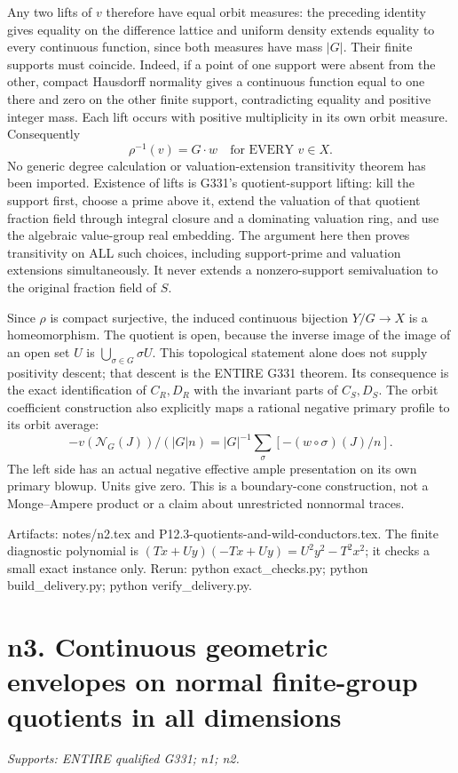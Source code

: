 \documentclass[11pt]{article}
\begin{document}
Any two lifts of $v$ therefore have equal orbit measures: the preceding
identity gives equality on the difference lattice and uniform density
extends equality to every continuous function, since both measures have
mass $|G|$. Their finite supports must coincide. Indeed, if a point of
one support were absent from the other, compact Hausdorff normality gives
a continuous function equal to one there and zero on the other finite
support, contradicting equality and positive integer mass. Each lift
occurs with positive multiplicity in its own orbit measure. Consequently
\[
 \rho^{-1}(v)=G\cdot w\quad\text{for EVERY }v\in X.
\]
No generic degree calculation or valuation-extension transitivity theorem
has been imported. Existence of lifts is G331's quotient-support lifting:
kill the support first, choose a prime above it, extend the valuation of
that quotient fraction field through integral closure and a dominating
valuation ring, and use the algebraic value-group real embedding.
The argument here then proves transitivity on ALL such choices, including
support-prime and valuation extensions simultaneously. It never extends
a nonzero-support semivaluation to the original fraction field of $S$.

Since $\rho$ is compact surjective, the induced continuous bijection
$Y/G\to X$ is a homeomorphism. The quotient is open, because the inverse
image of the image of an open set $U$ is $\bigcup_{\sigma\in G}\sigma U$.
This topological statement alone does not supply positivity descent;
that descent is the ENTIRE G331 theorem. Its consequence is the exact
identification of $C_R,D_R$ with the invariant parts of $C_S,D_S$.
The orbit coefficient construction also explicitly maps a rational
negative primary profile to its orbit average:
\[
 -v(\mathcal N_G(J))/(|G|n)
   =|G|^{-1}\sum_\sigma[-(w\circ\sigma)(J)/n].
\]
The left side has an actual negative effective ample presentation on its
own primary blowup. Units give zero. This is a boundary-cone construction,
not a Monge--Ampere product or a claim about unrestricted nonnormal traces.

Artifacts: notes/n2.tex and P12.3-quotients-and-wild-conductors.tex.
The finite diagnostic polynomial is $(Tx+Uy)(-Tx+Uy)=U^2y^2-T^2x^2$;
it checks a small exact instance only. Rerun: python exact\_checks.py;
python build\_delivery.py; python verify\_delivery.py.

\section{n3. Continuous geometric envelopes on normal finite-group quotients in all dimensions}
\textit{Supports: ENTIRE qualified G331; n1; n2.}
\end{document}
